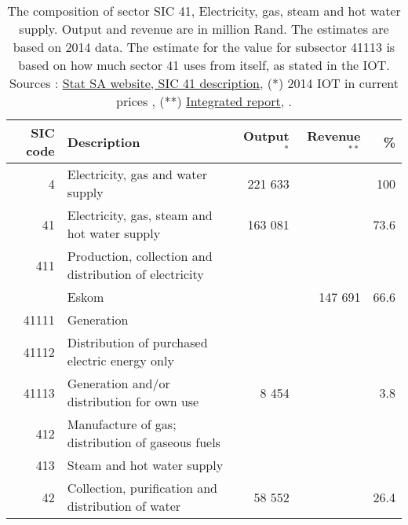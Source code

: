 \documentclass[12pt,english]{article}
\begin{document}
\begin{table}[ht]
	\centering
	\begin{tabular}{rlrrr}
		\toprule
		SIC code	& Description  & Output$^*$ & Revenue$^{**}$ & \%   \\ 
		\midrule
		4 & Electricity, gas and water supply & 221 633 & & 100 \\ 
		41 & Electricity, gas, steam and hot water supply &163 081& & 73.6 \\ 
		411 & Production, collection and distribution of electricity &  &  &  \\ 
		 & Eskom &  & 147 691 & 66.6 \\ 
		 41111 & Generation 	  	  	&& & \\
 		41112 & Distribution of purchased electric energy only 	&&  	&  	  	\\
		41113 & Generation and/or distribution for own use & 8 454& & 3.8\\
		412 & Manufacture of gas; distribution of gaseous fuels & & & \\ 
		413 & Steam and hot water supply &  & &\\ 
		42 & Collection, purification and distribution of water & 58 552 & &26.4 \\ 
		\bottomrule
	\end{tabular}
	\caption{\label{SIC41composition}The composition of sector SIC 41, Electricity, gas, steam and hot water supply. Output and revenue are in million Rand. The estimates are based on 2014 data. The estimate for the value for subsector 41113 is based on how much sector 41 uses from itself, as stated in the IOT. Sources : \href{http://www.statssa.gov.za/additional_services/sic/mdvdvmg4.htm}{Stat SA website, SIC 41 description}, (*) 2014 IOT in current prices \citep{IOT2014}, (**) \href{http://www.eskom.co.za/IR2015/Documents/EskomIR2015single.pdf}{Integrated report}, \citep{Eskom2014AR}.}
\end{table}
\end{document}
